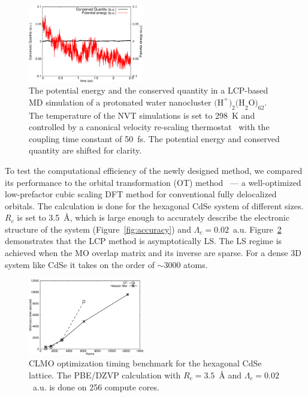 \documentclass[aps,prl,twocolumn,reprint,amsmath,amssymb]{revtex4-1}
\begin{document}
\begin{figure}
\includegraphics[width=0.45\textwidth]{const.eps}
\caption{The potential energy and the conserved quantity in a LCP-based MD simulation of a protonated water nanocluster $\text{(H}^{+}\text{)}_2\text{(H}_2\text{O)}_{62}$. The temperature of the NVT simulations is set to 298~K and controlled by a canonical velocity re-scaling thermostat~\cite{bussi2007canonical} with the coupling time constant of 50~fs. The potential energy and conserved quantity are shifted for clarity.}
\label{fig:md}
\end{figure}



To test the computational efficiency of the newly designed method, we compared its performance to the orbital transformation (OT) method~\cite{weber2008direct,vandevondele2003efficient} --- a well-optimized low-prefactor cubic scaling DFT method for conventional fully delocalized orbitals. The calculation is done for the hexagonal CdSe system of different sizes. $R_c$ is set to 3.5~{\AA}, which is large enough to accurately describe the electronic structure of the system (Figure~\ref{fig:accuracy}) and $\Lambda_c = 0.02$~a.u. Figure~\ref{fig:scaling} demonstrates that the LCP method is asymptotically LS. The LS regime is achieved when the MO overlap matrix and its inverse are sparse. For a dense 3D system like CdSe it takes on the order of $\sim$3000 atoms. 

\begin{figure}
\centering
\includegraphics[width=0.45\textwidth]{timing}
\caption{CLMO optimization timing benchmark for the hexagonal CdSe lattice. The PBE/DZVP calculation with $R_c=3.5$~{\AA} and $\Lambda_c = 0.02$~a.u. is done on 256 compute cores. 
}
\label{fig:scaling}
\end{figure}
\end{document}
